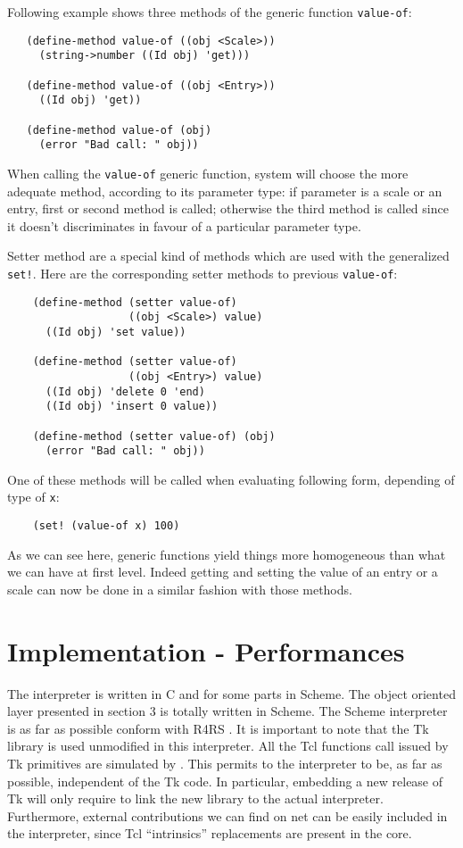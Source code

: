Following example shows three methods of the generic function {\tt value-of}:
{\small
\begin{verbatim}
   (define-method value-of ((obj <Scale>))
     (string->number ((Id obj) 'get)))

   (define-method value-of ((obj <Entry>))
     ((Id obj) 'get))
    
   (define-method value-of (obj)
     (error "Bad call: " obj))
\end{verbatim}
}
\noindent
When calling the {\tt value-of} generic function, system will choose 
the more adequate method, according to its parameter type: if parameter is a
scale or an entry, first  or second method is called; otherwise the third
method is called since it doesn't discriminates in favour of a particular
parameter type.

Setter method are a special kind of methods which are used with the
generalized {\tt set!}. Here are the corresponding setter methods to previous 
{\tt value-of}:
{\small
\begin{verbatim}
    (define-method (setter value-of)
                   ((obj <Scale>) value)
      ((Id obj) 'set value))

    (define-method (setter value-of)
                   ((obj <Entry>) value)
      ((Id obj) 'delete 0 'end)
      ((Id obj) 'insert 0 value))
    
    (define-method (setter value-of) (obj)
      (error "Bad call: " obj))
\end{verbatim}
}
\noindent
One of these methods will be called when evaluating following form, depending
of type of {\tt x}:
{\small
\begin{verbatim}
    (set! (value-of x) 100)
\end{verbatim}
}
\noindent
As we can see here, generic functions yield things more homogeneous than what
we can have at \stk first level. Indeed getting and setting the value of an
entry or a scale can now be done in a similar fashion with those methods.

\section{Implementation - Performances}
The \stk interpreter is written in C and for some parts in Scheme. The object
oriented layer presented in section 3 is totally written in Scheme.  The
Scheme interpreter is as far as possible conform with R4RS \cite{R4RS}. It
is important to note that the Tk library is used unmodified in this
interpreter.  All the Tcl functions call issued by Tk primitives are simulated
by \stk.  This permits to the \stk interpreter to be, as far as possible,
independent of the Tk code. In particular, embedding a new release of Tk will
only require to link the new library to the actual {\stk}
interpreter. Furthermore, external contributions we can find on net can be
easily included in the interpreter, since Tcl ``intrinsics'' replacements are
present in the \stk core.

